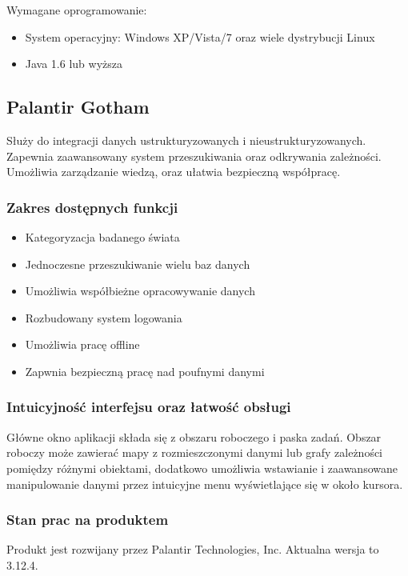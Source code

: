 \documentclass[11pt,a4paper]{article}
\begin{document}
\raggedright{Wymagane oprogramowanie:}
\begin{itemize}
	\item System operacyjny:  Windows XP/Vista/7 oraz wiele dystrybucji Linux
	\item Java 1.6 lub wyższa
\end{itemize}

\subsection{Palantir Gotham}


Służy do integracji danych ustrukturyzowanych i nieustrukturyzowanych. Zapewnia zaawansowany system przeszukiwania oraz odkrywania zależności. Umożliwia zarządzanie wiedzą, oraz ułatwia bezpieczną współpracę.

\subsubsection*{Zakres dostępnych funkcji}

\begin{itemize}
	\item Kategoryzacja badanego świata
	\item Jednoczesne przeszukiwanie wielu baz danych
	\item Umożliwia współbieżne opracowywanie danych
	\item Rozbudowany system logowania
	\item Umożliwia pracę offline
	\item Zapwnia bezpieczną pracę nad poufnymi danymi
\end{itemize}

\subsubsection*{Intuicyjność interfejsu oraz łatwość obsługi}

Główne okno aplikacji składa się z obszaru roboczego i paska zadań. Obszar roboczy może zawierać mapy z rozmieszczonymi danymi lub grafy zależności pomiędzy różnymi obiektami, dodatkowo umożliwia wstawianie i zaawansowane manipulowanie danymi przez intuicyjne menu wyświetlające się w około kursora.  

\subsubsection*{Stan prac na produktem}
Produkt jest rozwijany przez Palantir Technologies, Inc. Aktualna wersja to 3.12.4.
\end{document}
